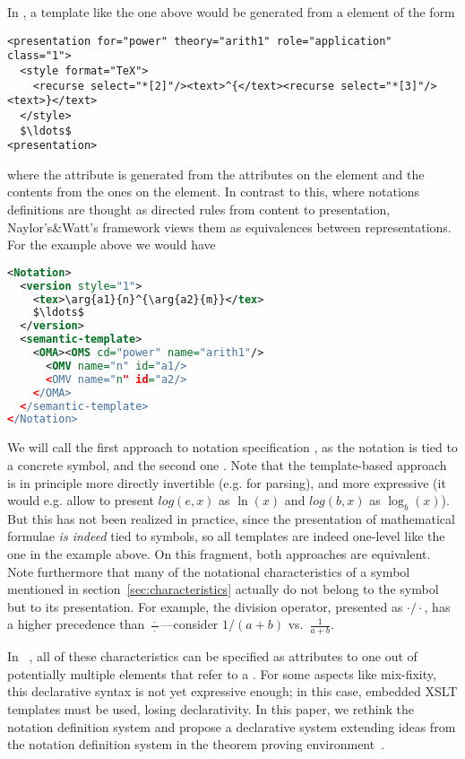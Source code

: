 In {\omdoc}, a template like the one above would be generated from a
{} element of the form
\begin{lstlisting}[mathescape]
<presentation for="power" theory="arith1" role="application" class="1">
  <style format="TeX">
    <recurse select="*[2]"/><text>^{</text><recurse select="*[3]"/><text>}</text>
  </style>
  $\ldots$
<presentation>
\end{lstlisting}
where the {} attribute is generated from the
attributes on the {} element and the contents from the ones on the
{} element. In contrast to this, where notations definitions are thought as
directed rules from content to presentation, Naylor's\&Watt's framework views them as
equivalences between representations. For the example above we would have
\begin{lstlisting}[mathescape,language=XML,morekeywords={Notation,version,semantic-template},
caption=A Template-Based Notation Definition,label=lst:template-based]
<Notation>
  <version style="1">
    <tex>\arg{a1}{n}^{\arg{a2}{m}}</tex>
    $\ldots$
  </version>
  <semantic-template>
    <OMA><OMS cd="power" name="arith1"/>
      <OMV name="n" id="a1/>
      <OMV name="n" id="a2/>
    </OMA>
  </semantic-template>
</Notation>
\end{lstlisting}
We will call the first approach to notation specification {}, as the
notation is tied to a concrete symbol, and the second one {}. Note
that the template-based approach is in principle more directly invertible (e.g. for
parsing), and more expressive (it would e.g. allow to present $log(e,x)$ as $\ln(x)$ and
$log(b,x)$ as $\log_b(x)$). But this has not been realized in practice, since the
presentation of mathematical formulae {\emph{is indeed}} tied to symbols, so all templates
are indeed one-level like the one in the example above. On this fragment, both approaches
are equivalent. Note furthermore that many of the notational characteristics of a symbol
mentioned in section~\ref{sec:characteristics} actually do not belong to the symbol but to
its presentation. For example, the division operator, presented as $\cdot/\cdot$, has a
higher precedence than $\frac{\;\cdot\;}{\;\cdot\;}$---consider $1/(a+b)$ vs.\
$\frac{1}{a+b}$.

In {}~\cite{Kohlhase:omdoc1.2}, all of these characteristics can be specified
as attributes to one out of potentially multiple {\element{presentation}} elements that
refer to a {\element{symbol}}. For some aspects like mix-fixity, this declarative syntax
is not yet expressive enough; in this case, embedded XSLT templates must be used, losing
declarativity. In this paper, we rethink the notation definition system and propose a
declarative system extending ideas from the notation definition system in the {\isabelle}
theorem proving environment~\cite{Paulson:Isabelle05}.


